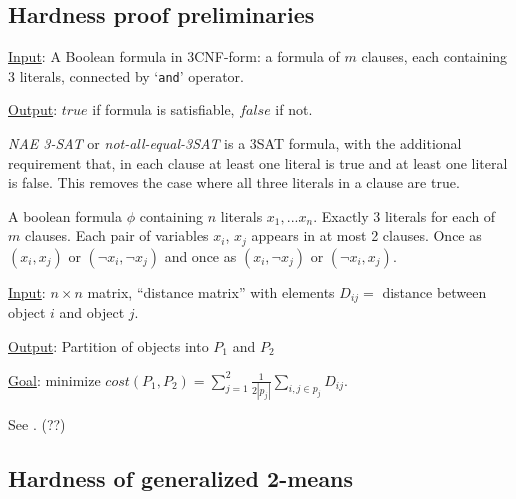 \subsection{Hardness proof preliminaries}
\begin{definition}[3SAT]
\item \underline{Input}:  A Boolean formula in 3CNF-form: a formula of
  $m$ clauses, each containing 3 literals, connected by `\texttt{and}'
  operator.
\item \underline{Output}:  $\textit{true}$ if formula is satisfiable,
  $\textit{false}$ if not.
\end{definition}

\begin{definition} \emph{NAE 3-SAT} or
  \emph{not-all-equal-3SAT} is a 3SAT formula, with the additional
  requirement that, in each clause at least one literal is true and at
  least one literal is false.  This removes the case where all three
  literals in a clause are true.   
\end{definition}

\begin{definition} 
A boolean formula $\phi$ containing $n$ literals $x_1,...x_n$.
Exactly 3 literals for each of $m$ clauses.  Each pair of variables
$x_i$, $x_j$ appears in at most 2 clauses.  Once as $(x_i,x_j)$ or
$(\neg x_i, \neg x_j)$ and once as  $(x_i,\neg x_j)$ or $(\neg x_i,
x_j)$. 
\end{definition}

\begin{definition}
\item \underline{Input}:  $n \times n$ matrix, ``distance matrix''
  with elements $D_{ij} = $ distance between object $i$ and object
  $j$.
\item \underline{Output}:  Partition of objects into $P_1$ and $P_2$
\item \underline{Goal}: minimize $cost(P_1,P_2) = \sum_{j=1}^{2}
  \frac{1}{2|p_j|} \sum_{i,j \in p_j} D_{ij}$. 
\end{definition}


\begin{lemma} \label{np-nae-3-sat}
See \cite{das2008}. (??)
\end{lemma}

\subsection{Hardness of generalized 2-means}

